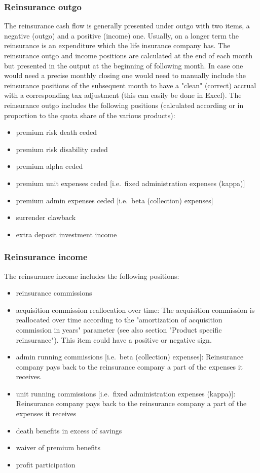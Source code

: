 \subsubsection{Reinsurance outgo}
The reinsurance cash flow is generally presented under outgo with two items, a negative (outgo) and a positive (income) one. Usually, on a longer term the reinsurance is an expenditure which the life insurance company has. The reinsurance outgo and income positions are calculated at the end of each month but presented in the output at the beginning of following month. In case one would need a precise monthly closing one would need to manually include the reinsurance positions of the subsequent month to have a "clean" (correct) accrual with a corresponding tax adjustment (this can easily be done in Excel). The reinsurance outgo includes the following positions (calculated according or in proportion to the quota share of the various products):
\begin{itemize}
	\item premium risk death ceded
	\item premium risk disability ceded
	\item premium alpha ceded
	\item premium unit expenses ceded [i.e.~fixed administration expenses (kappa)]
	\item premium admin expenses ceded [i.e.~beta (collection) expenses] 
	\item surrender clawback
	\item extra deposit investment income
\end{itemize}

\subsubsection{Reinsurance income}
The reinsurance income includes the following positions:
\begin{itemize}
	\item reinsurance commissions
	\item acquisition commission reallocation over time: The acquisition commission is reallocated over time according to the "amortization of acquisition commission in years" parameter (see also section "Product specific reinsurance"). This item could have a positive or negative sign.
	\item admin running commissions [i.e.~beta (collection) expenses]: Reinsurance company pays back to the reinsurance company a part of the expenses it receives.
	\item unit running commissions [i.e.~fixed administration expenses (kappa)]: Reinsurance company pays back to the reinsurance company a part of the expenses it receives
	\item death benefits in excess of savings
	\item waiver of premium benefits
	\item profit participation
\end{itemize}

